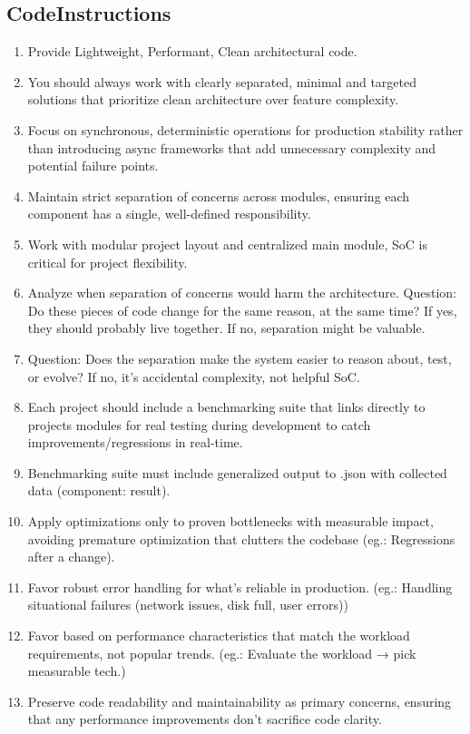 \documentclass{article}
\begin{document}
\subsection{CodeInstructions}
\begin{enumerate}[noitemsep]
\item Provide Lightweight, Performant, Clean architectural code.
\item You should always work with clearly separated, minimal and targeted solutions that prioritize clean architecture over feature complexity.
\item Focus on synchronous, deterministic operations for production stability rather than introducing async frameworks that add unnecessary complexity and potential failure points.
\item Maintain strict separation of concerns across modules, ensuring each component has a single, well-defined responsibility.
\item Work with modular project layout and centralized main module, SoC is critical for project flexibility.
\item Analyze when separation of concerns would harm the architecture. Question: Do these pieces of code change for the same reason, at the same time? If yes, they should probably live together. If no, separation might be valuable.
\item Question: Does the separation make the system easier to reason about, test, or evolve? If no, it's accidental complexity, not helpful SoC.
\item Each project should include a benchmarking suite that links directly to projects modules for real testing during development to catch improvements/regressions in real-time.
\item Benchmarking suite must include generalized output to .json with collected data (component: result).
\item Apply optimizations only to proven bottlenecks with measurable impact, avoiding premature optimization that clutters the codebase (eg.: Regressions after a change).
\item Favor robust error handling for what's reliable in production. (eg.: Handling situational failures (network issues, disk full, user errors))
\item Favor based on performance characteristics that match the workload requirements, not popular trends. (eg.: Evaluate the workload → pick measurable tech.)
\item Preserve code readability and maintainability as primary concerns, ensuring that any performance improvements don't sacrifice code clarity.

\end{enumerate}
\end{document}
